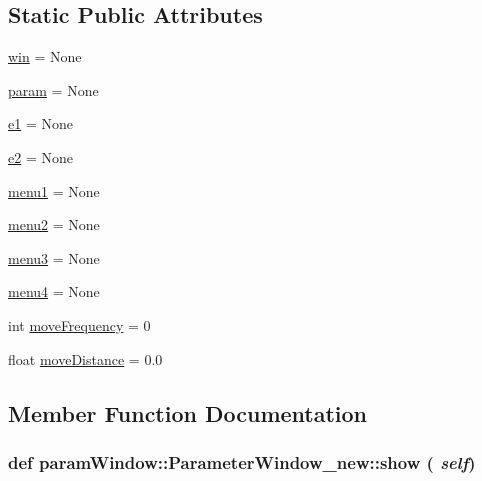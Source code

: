 \subsection*{Static Public Attributes}
\begin{CompactItemize}
\item 
\hyperlink{classparamWindow_1_1ParameterWindow__new_2a9c97314dbcb07e98405f6e067febd5}{win} = None
\item 
\hyperlink{classparamWindow_1_1ParameterWindow__new_5dab680a9ccb92d79665bf5a869df54c}{param} = None
\item 
\hyperlink{classparamWindow_1_1ParameterWindow__new_43095ddbc7c8f063214a60b8ad244472}{e1} = None
\item 
\hyperlink{classparamWindow_1_1ParameterWindow__new_7feea58a597ee5de27b20161bf2b6fba}{e2} = None
\item 
\hyperlink{classparamWindow_1_1ParameterWindow__new_d430bdc0e6d04a64427562478728a7d5}{menu1} = None
\item 
\hyperlink{classparamWindow_1_1ParameterWindow__new_77f73f3280a70dccbe42ac0e6e75f5d6}{menu2} = None
\item 
\hyperlink{classparamWindow_1_1ParameterWindow__new_93ced809b04332c622b88e07477c8060}{menu3} = None
\item 
\hyperlink{classparamWindow_1_1ParameterWindow__new_c2de943b2b1f1bc9f00006446627f83c}{menu4} = None
\item 
int \hyperlink{classparamWindow_1_1ParameterWindow__new_ffa5ad04bcfb9402aca1badab93e58c6}{moveFrequency} = 0
\item 
float \hyperlink{classparamWindow_1_1ParameterWindow__new_41e48af2ccc19b5f67e19cd8818d1842}{moveDistance} = 0.0
\end{CompactItemize}


\subsection{Member Function Documentation}
\hypertarget{classparamWindow_1_1ParameterWindow__new_9067ebe4b68f0ac638ddd4c9767f6242}{
\subsubsection{\setlength{\rightskip}{0pt plus 5cm}def paramWindow::ParameterWindow\_\-new::show ( {\em self})}}
\label{classparamWindow_1_1ParameterWindow__new_9067ebe4b68f0ac638ddd4c9767f6242}


